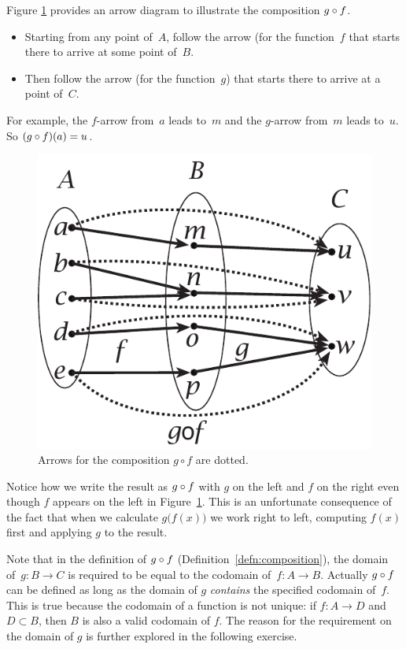 \begin{example}{}
Figure \ref{arrowcomposefig} provides an arrow diagram to illustrate the composition $g \circ f$.
\begin{itemize}
\item Starting from any point of~$A$, follow the arrow (for the function~$f$ that starts there to arrive at some point of~$B$.
\item Then follow the arrow (for the function~$g$) that starts there to arrive at a point of~$C$.
\end{itemize}
For example, the $f$-arrow from~$a$ leads to~$m$ and the $g$-arrow from~$m$ leads to~$u$. So $(g \circ f)(a) = u$.
\begin{figure}[h]
\includegraphics[scale=0.55]{images/arrowcompose.pdf}
\caption{Arrows for the composition $g \circ f$ are dotted.}
\label{arrowcomposefig}
\end{figure}
Notice how we write the result as $g \circ f$ with $g$ on the left and $f$ on the right even though $f$ appears on the left in Figure~\ref{arrowcomposefig}. This is an unfortunate consequence of the fact that when we calculate $g \bigl(f(x) \bigr)$ we work right to left, computing $f(x)$ first and applying $g$ to the result.
\end{example}

Note that in the definition of $g \circ f$ (Definition~\ref{defn:composition}), the domain of~$g:B\rightarrow C$ is required to be equal to the codomain of~$f:A \rightarrow B$. Actually $g \circ f$ can be defined as long as the domain of $g$ \emph{contains} the specified codomain of~$f$. This is true because the codomain of a function is not unique: if $f: A \rightarrow D$ and $D \subset B$, then $B$ is also a valid codomain of $f$. The reason for the requirement on the domain of $g$ is further explored in the following exercise.


